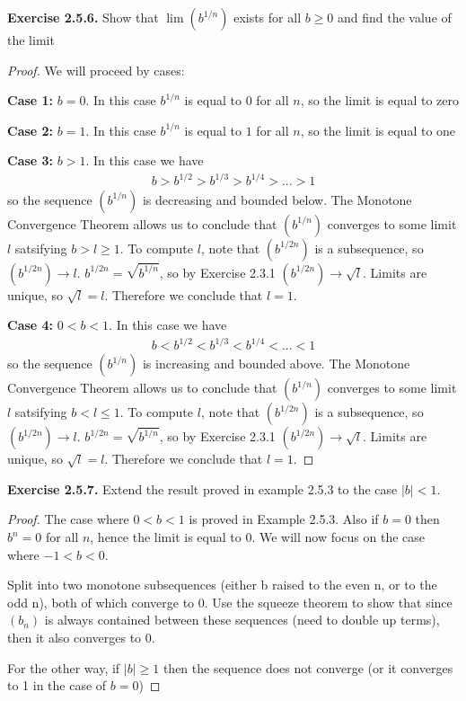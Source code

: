 \documentclass{article}
\begin{document}
\textbf{Exercise 2.5.6.} Show that $\lim(b^{1/n})$ exists for all $b \ge 0$ and find the value of the limit

\begin{proof}
    We will proceed by cases:

    \textbf{Case 1:} $b = 0$. In this case $b^{1/n}$ is equal to $0$ for all $n$, so the limit is equal to zero

    \textbf{Case 2:} $b = 1$. In this case $b^{1/n}$ is equal to $1$ for all $n$, so the limit is equal to one
    
    \textbf{Case 3:} $b > 1$. In this case we have
    \begin{align*}
        b > b^{1/2} > b^{1/3} > b^{1/4} > ... > 1
    \end{align*}
    so the sequence $(b^{1/n})$ is decreasing and bounded below. The Monotone Convergence Theorem allows us to conclude that
    $(b^{1/n})$ converges to some limit $l$ satsifying $b > l \ge 1$. To compute $l$, note that $(b^{1/2n})$ is a subsequence, so
    $(b^{1/2n}) \to l$. $b^{1/2n} = \sqrt{b^{1/n}}$, so by Exercise 2.3.1 $(b^{1/2n}) \to \sqrt{l}$. Limits are unique, so $\sqrt{l} = l$.
    Therefore we conclude that $l = 1$.

    \textbf{Case 4:} $0 < b < 1$. In this case we have
    \begin{align*}
        b < b^{1/2} < b^{1/3} < b^{1/4} < ... < 1
    \end{align*}
    so the sequence $(b^{1/n})$ is increasing and bounded above. The Monotone Convergence Theorem allows us to conclude that
    $(b^{1/n})$ converges to some limit $l$ satsifying $b < l \le 1$. To compute $l$, note that $(b^{1/2n})$ is a subsequence, so
    $(b^{1/2n}) \to l$. $b^{1/2n} = \sqrt{b^{1/n}}$, so by Exercise 2.3.1 $(b^{1/2n}) \to \sqrt{l}$. Limits are unique, so $\sqrt{l} = l$.
    Therefore we conclude that $l = 1$.
\end{proof}

\textbf{Exercise 2.5.7.} Extend the result proved in example 2.5.3 to the case $|b| < 1$.

\begin{proof}
    The case where $0 < b < 1$ is proved in Example 2.5.3. Also if $b = 0$ then $b^n = 0$ for all $n$, hence the limit is equal to 0.
    We will now focus on the case where $-1 < b < 0$.

    Split into two monotone subsequences (either b raised to the even n, or to the odd n), both of which converge to 0. Use the squeeze
    theorem to show that since $(b_n)$ is always contained between these sequences (need to double up terms), then it also 
    converges to 0.

    For the other way, if $|b| \ge 1$ then the sequence does not converge (or it converges to 1 in the case of $b = 0$)
\end{proof}
\end{document}
